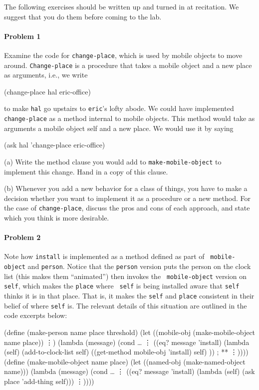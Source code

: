 The following exercises should be written up and turned in at
recitation.  We suggest that you do them before coming to the lab.

\paragraph{Problem 1}  

Examine the code for {\tt change-place}, which is used by mobile
objects to move around.  {\tt Change-place} is a procedure that takes
a mobile object and a new place as arguments, i.e., we write 

\beginlisp
(change-place hal eric-office)
\endlisp

to make {\tt hal} go upstairs to {\tt eric}'s lofty abode.  We could
have implemented {\tt change-place} as a method internal to mobile
objects.  This method would take as arguments a mobile object self and
a new place.  We would use it by saying 

\beginlisp
(ask hal 'change-place eric-office)
\endlisp

(a) Write the method clause you would add to {\tt make-mobile-object}
to implement this change.  Hand in a copy of this clause.

(b) Whenever you add a new behavior for a class of things, you have
to make a decision whether you want to implement it as a procedure or
a new method.  For the case of {\tt change-place}, discuss the pros
and cons of each approach, and state which you think is more
desirable.  

\paragraph{Problem 2}

Note how {\tt install} is implemented as a method defined as part of {\tt
mobile-object} and {\tt person}. Notice that the {\tt person} version puts the
person on the clock list (this makes them ``animated'') then invokes the {\tt
mobile-object} version on {\tt self}, which makes the {\tt place} where {\tt
self} is being installed aware that {\tt self} thinks it is in that place. That
is, it makes the {\tt self} and {\tt place} consistent in their belief of where
{\tt self} is. The relevant details of this situation are outlined in the code
excerpts below:

\beginlisp
(define (make-person name place threshold)
  (let ((mobile-obj (make-mobile-object name place))
        \vdots)
    (lambda (message)
      (cond \ldots
            \vdots
            ((eq? message 'install)
             (lambda (self)
               (add-to-clock-list self)
               ((get-method mobile-obj 'install) self) ))   ; **
            \vdots))))
\null
(define (make-mobile-object name place)
  (let ((named-obj (make-named-object name)))
    (lambda (message)
      (cond \ldots
            \vdots
            ((eq? message 'install)
             (lambda (self)
               (ask place 'add-thing self)))
            \vdots))))
\endlisp
      
